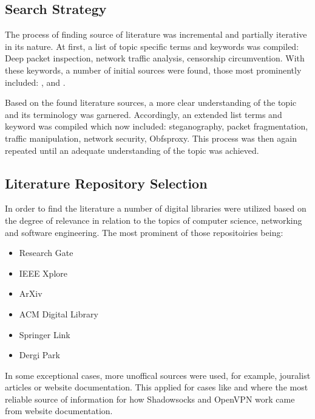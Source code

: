 \documentclass[12pt, fleqn, a4paper]{article}
\begin{document}
\subsection{Search Strategy}
The process of finding source of literature was incremental and partially iterative in its nature. At first, a list of topic specific terms and keywords was compiled: Deep packet inspection, network traffic analysis, censorship circumvention. 
With these keywords, a number of initial sources were found, those most prominently included: \cite{Geneva}, \cite{gohop} and \cite{DPL}.

Based on the found literature sources, a more clear understanding of the topic and its terminology was garnered. Accordingly, an extended list terms and keyword was compiled which now included: steganography, packet fragmentation, traffic manipulation, network security, Obfsproxy. 
This process was then again repeated until an adequate understanding of the topic was achieved.

\subsection{Literature Repository Selection}
In order to find the literature a number of digital libraries were utilized based on the degree of relevance in relation to the topics of computer science, networking and software engineering. The most prominent of those repositoiries being:
\begin{itemize}
  \item Research Gate
  \item IEEE Xplore
  \item ArXiv
  \item ACM Digital Library
  \item Springer Link
  \item Dergi Park
\end{itemize}
In some exceptional cases, more unoffical sources were used, for example, jouralist articles or website documentation. This applied for cases like \cite{Shadowsocks} and \cite{openvpn2} where the most reliable source of information for how Shadowsocks and OpenVPN work came from website documentation.
\end{document}
